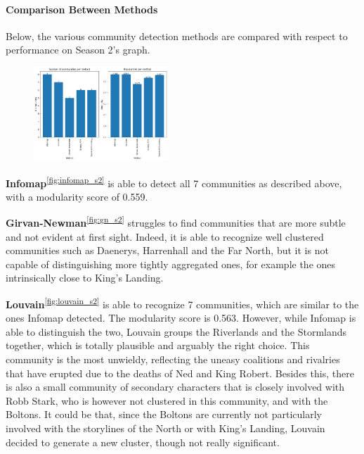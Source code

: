 \documentclass[10pt,twocolumn,letterpaper]{article}
\begin{document}
\paragraph{Comparison Between Methods}

Below, the various community detection methods are compared with respect to performance on Season 2's graph.

\begin{figure}[!h]
    \centering
    \includegraphics[width=0.45\textwidth]{img/s2/communities_comparison.jpg} \\
    \label{fig:comm_comp_s2}
\end{figure}

\textbf{Infomap}\textsuperscript{\ref{fig:infomap_s2}} is able to detect all 7 communities as described above, with a modularity score of 0.559. 

\textbf{Girvan-Newman}\textsuperscript{\ref{fig:gn_s2}} struggles to find communities that are more subtle and not evident at first sight. Indeed, it is able to recognize well clustered communities such as Daenerys, Harrenhall and the Far North, but it is not capable of distinguishing more tightly aggregated ones, for example the ones intrinsically close to King's Landing.

\textbf{Louvain}\textsuperscript{\ref{fig:louvain_s2}} is able to recognize 7 communities, which are similar to the ones Infomap detected. The modularity score is 0.563. However, while Infomap is able to distinguish the two, Louvain groups the Riverlands and the Stormlands together, which is totally plausible and arguably the right choice. This community is the most unwieldy, reflecting the uneasy coalitions and rivalries that have erupted due to the deaths of Ned and King Robert. 
Besides this, there is also a small community of secondary characters that is closely involved with Robb Stark, who is however not clustered in this community, and with the Boltons. It could be that, since the Boltons are currently not particularly involved with the storylines of the North or with King's Landing, Louvain decided to generate a new cluster, though not really significant.
\end{document}
